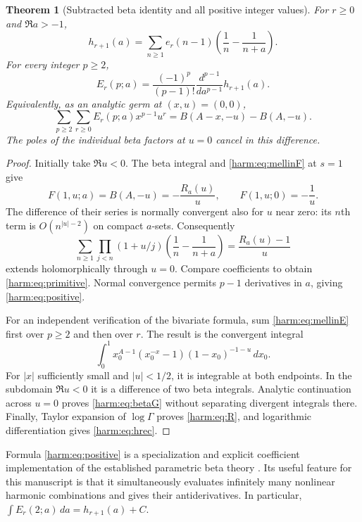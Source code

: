 \documentclass[11pt,letterpaper]{article}
\numberwithin{equation}{section}
\theoremstyle{plain}
\newtheorem{theorem}{Theorem}[section]
\theoremstyle{definition}
\theoremstyle{remark}
\begin{document}
\begin{theorem}[Subtracted beta identity and all positive integer values]
\label{harm:thm:beta}
For $r\geq0$ and $\Re a>-1$,
\begin{equation}\label{harm:eq:primitive}
 \boxed{\quad
 h_{r+1}(a)=\sum_{n\geq1}e_r(n-1)
           \left(\frac1n-\frac1{n+a}\right).
 \quad}
\end{equation}
For every integer $p\geq2$,
\begin{equation}\label{harm:eq:positive}
 \boxed{\quad
 E_r(p;a)=\frac{(-1)^p}{(p-1)!}
               \frac{d^{p-1}}{da^{p-1}}h_{r+1}(a).
 \quad}
\end{equation}
Equivalently, as an analytic germ at $(x,u)=(0,0)$,
\begin{equation}\label{harm:eq:betaG}
 \sum_{p\geq2}\sum_{r\geq0}E_r(p;a)x^{p-1}u^r
       =B(A-x,-u)-B(A,-u).
\end{equation}
The poles of the individual beta factors at $u=0$ cancel in this
difference.
\end{theorem}
\begin{proof}
Initially take $\Re u<0$.  The beta integral and
\eqref{harm:eq:mellinF} at $s=1$ give
\[
 F(1,u;a)=B(A,-u)=-\frac{R_a(u)}u,
 \qquad F(1,u;0)=-\frac1u.
\]
The difference of their series is normally convergent also for $u$
near zero: its $n$th term is $O(n^{|u|-2})$ on compact $a$-sets.
Consequently
\[
 \sum_{n\geq1}\prod_{j<n}(1+u/j)
       \left(\frac1n-\frac1{n+a}\right)
          =\frac{R_a(u)-1}{u}
\]
extends holomorphically through $u=0$.  Compare coefficients to
obtain \eqref{harm:eq:primitive}.  Normal convergence permits
$p-1$ derivatives in $a$, giving \eqref{harm:eq:positive}.

For an independent verification of the bivariate formula, sum
\eqref{harm:eq:mellinE} first over $p\geq2$ and then over $r$.
The result is the convergent integral
\[
 \int_0^1x_0^{A-1}(x_0^{-x}-1)(1-x_0)^{-1-u}\,dx_0.
\]
For $|x|$ sufficiently small and $|u|<1/2$, it is integrable at
both endpoints.  In the subdomain $\Re u<0$ it is a difference of
two beta integrals.  Analytic continuation across $u=0$ proves
\eqref{harm:eq:betaG} without separating divergent integrals there.
Finally, Taylor expansion of $\log\Gamma$ proves \eqref{harm:eq:R},
and logarithmic differentiation gives \eqref{harm:eq:hrec}.
\end{proof}

Formula \eqref{harm:eq:positive} is a specialization and explicit
coefficient implementation of the established parametric beta theory
\cite{Young2026}.  Its useful feature for this manuscript is that it
simultaneously evaluates infinitely many nonlinear harmonic combinations
and gives their antiderivatives.  In particular,
$\int E_r(2;a)\,da=h_{r+1}(a)+C$.
\end{document}
